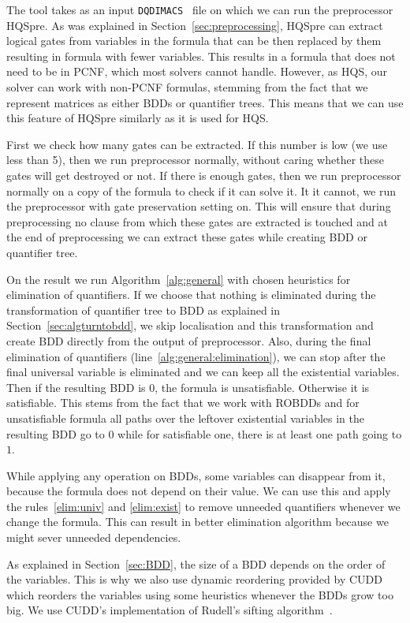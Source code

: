 \documentclass[
  digital, %
  color,
  twoside, %
  table,   %
  nolof,     %
  nolot,     %
]{fithesis3}
\theoremstyle{definition}
\theoremstyle{remark}
\newcommand{\DQDIMACS}[0]{\texttt{DQDIMACS}}
\begin{document}
The tool takes as an input \DQDIMACS{}~\cite{iDQandDQDIMACS} file on which we can run the preprocessor HQSpre. As was explained in Section~\ref{sec:preprocessing}, HQSpre can extract logical gates from variables in the formula that can be then replaced by them resulting in formula with fewer variables. This results in a formula that does not need to be in PCNF, which most solvers cannot handle. However, as HQS, our solver can work with non-PCNF formulas, stemming from the fact that we represent matrices as either BDDs or quantifier trees. This means that we can use this feature of HQSpre similarly as it is used for HQS.

First we check how many gates can be extracted. If this number is low (we use less than 5), then we run preprocessor normally, without caring whether these gates will get destroyed or not. If there is enough gates, then we run preprocessor normally on a copy of the formula to check if it can solve it. It it cannot, we run the preprocessor with gate preservation setting on. This will ensure that during preprocessing no clause from which these gates are extracted is touched and at the end of preprocessing we can extract these gates while creating BDD or quantifier tree.

On the result we run Algorithm~\ref{alg:general} with chosen heuristics for elimination of quantifiers. If we choose that nothing is eliminated during the transformation of quantifier tree to BDD as explained in Section~\ref{sec:algturntobdd}, we skip localisation and this transformation and create BDD directly from the output of preprocessor. Also, during the final elimination of quantifiers (line~\ref{alg:general:elimination}), we can stop after the final universal variable is eliminated and we can keep all the existential variables. Then if the resulting BDD is $0$, the formula is unsatisfiable. Otherwise it is satisfiable. This stems from the fact that we work with ROBDDs and for unsatisfiable formula all paths over the leftover existential variables in the resulting BDD go to $0$ while for satisfiable one, there is at least one path going to $1$.

While applying any operation on BDDs, some variables can disappear from it, because the formula does not depend on their value. We can use this and apply the rules~\eqref{elim:univ} and \eqref{elim:exist} to remove unneeded quantifiers whenever we change the formula. This can result in better elimination algorithm because we might sever unneeded dependencies.

As explained in Section~\ref{sec:BDD}, the size of a BDD depends on the order of the variables. This is why we also use dynamic reordering provided by CUDD which reorders the variables using some heuristics whenever the BDDs grow too big. We use CUDD's implementation of Rudell's sifting algorithm~\cite{BDDsifting}.
\end{document}
